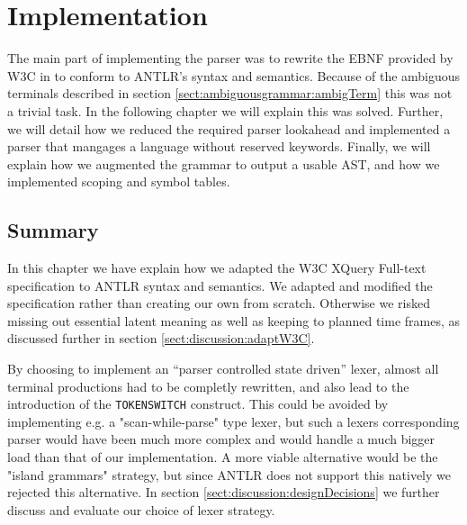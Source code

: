 \chapter{Implementation}
\label{chapter:implementation}

The main part of implementing the parser was to rewrite the EBNF provided by
W3C in \cite{w3c01} to conform to ANTLR's syntax and semantics. Because of the
ambiguous terminals described in section \ref{sect:ambiguousgrammar:ambigTerm}
this was not a trivial task. In the following chapter we will explain this
was solved. Further, we will detail how we reduced the required parser
lookahead and implemented a parser that mangages a language without reserved
keywords. Finally, we will explain how we augmented the grammar to output a
usable AST, and how we implemented scoping and symbol tables.













\section{Summary}
In this chapter we have explain how we adapted the W3C
XQuery Full-text specification to ANTLR syntax and semantics. We adapted and
modified the specification rather than creating our own from scratch. Otherwise
we risked missing out essential latent meaning as well as keeping to planned
time frames, as discussed further in section \ref{sect:discussion:adaptW3C}.    

By choosing to implement an ``parser controlled state driven'' lexer, almost all
terminal productions  had to be completly rewritten, and also lead to the
introduction of the \verb!TOKENSWITCH! construct. This could be avoided by
implementing e.g. a "scan-while-parse" type lexer, but such a lexers
corresponding parser would have been much more complex and would handle a much
bigger load than that of our implementation. A more viable alternative would be
the "island grammars" strategy, but since ANTLR does not support this natively we
rejected this alternative. In section \ref{sect:discussion:designDecisions} we
further discuss and evaluate our choice of lexer strategy.

